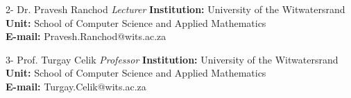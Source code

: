\documentclass[letterpaper]{moderncv}        %
\begin{document}
\cventry
{2-}
{Dr. Pravesh Ranchod}
{}
{\textit{Lecturer}}
{}
{\textbf{Institution:} University of the Witwatersrand\\
	\textbf{Unit:} School of Computer Science and Applied Mathematics\\
	\textbf{E-mail:} Pravesh.Ranchod@wits.ac.za}
\vspace{1mm}

\cventry
{3-}
{Prof. Turgay Celik}
{}
{\textit{Professor}}
{}
{\textbf{Institution:} University of the Witwatersrand\\
	\textbf{Unit:} School of Computer Science and Applied Mathematics\\
	\textbf{E-mail:} Turgay.Celik@wits.ac.za}
\vspace{1mm}
\end{document}
